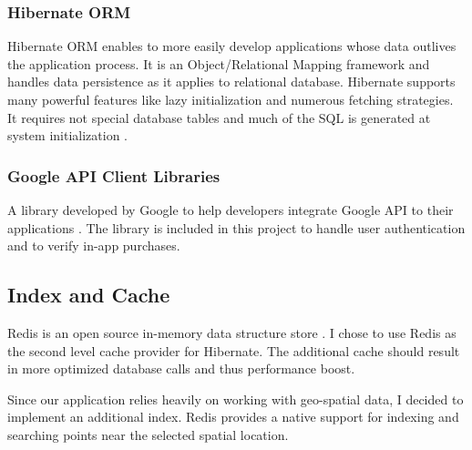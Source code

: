 		\subsubsection{Hibernate ORM}
		Hibernate ORM enables to more easily develop applications whose data outlives the application process. It is an Object/Relational Mapping framework and handles data persistence as it applies to relational database. Hibernate supports many powerful features like lazy initialization and numerous fetching strategies. It requires not special database tables and much of the SQL is generated at system initialization \cite{hibernate}.
		
		\subsubsection{Google API Client Libraries}
		A library developed by Google to help developers integrate Google API to their applications \cite{googleapilibs}. The library is included in this project to handle user authentication and to verify in-app purchases.
		
	\subsection{Index and Cache}
	Redis is an open source in-memory data structure store \cite{redis}. I chose to use Redis as the second level cache provider for Hibernate. The additional cache should result in more optimized database calls and thus performance boost.
	
	Since our application relies heavily on working with geo-spatial data, I decided to implement an additional index. Redis provides a native support for indexing and  searching points near the selected spatial location.		